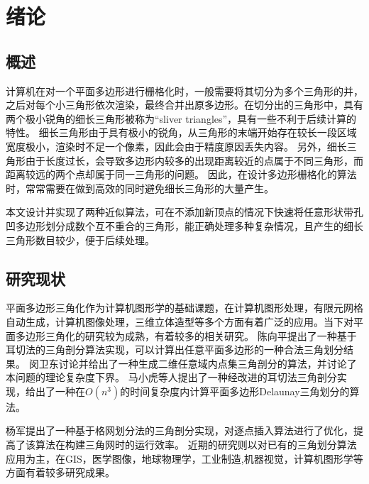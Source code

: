 
\chapter{绪论}

\section{概述}
  计算机在对一个平面多边形进行栅格化时，一般需要将其切分为多个三角形的并，之后对每个小三角形依次渲染，最终合并出原多边形。在切分出的三角形中，具有两个极小锐角的细长三角形被称为“sliver triangles”，具有一些不利于后续计算的特性。
  细长三角形由于具有极小的锐角，从三角形的末端开始存在较长一段区域宽度极小，渲染时不足一个像素，因此会由于精度原因丢失内容。
  另外，细长三角形由于长度过长，会导致多边形内较多的出现距离较近的点属于不同三角形，而距离较远的两个点却属于同一三角形的问题。
  因此，在设计多边形栅格化的算法时，常常需要在做到高效的同时避免细长三角形的大量产生。

  本文设计并实现了两种近似算法，可在不添加新顶点的情况下快速将任意形状带孔凹多边形划分成数个互不重合的三角形，能正确处理多种复杂情况，且产生的细长三角形数目较少，便于后续处理。
\section{研究现状}

平面多边形三角化作为计算机图形学的基础课题，在计算机图形处理，有限元网格自动生成，计算机图像处理，三维立体造型等多个方面有着广泛的应用。当下对平面多边形三角化的研究较为成熟，有着较多的相关研究。
陈向平提出了一种基于耳切法的三角剖分算法实现，可以计算出任意平面多边形的一种合法三角划分结果。
闵卫东讨论并给出了一种生成二维任意域内点集三角剖分的算法，并讨论了本问题的理论复杂度下界。
马小虎等人提出了一种经改进的耳切法三角剖分实现，给出了一种在\(O(n^3)\)的时间复杂度内计算平面多边形Delaunay三角划分的算法。

杨军提出了一种基于格网划分法的三角剖分实现，对逐点插入算法进行了优化，提高了该算法在构建三角网时的运行效率。
近期的研究则以对已有的三角划分算法应用为主，在GIS，医学图像，地球物理学，工业制造,机器视觉，计算机图形学等方面有着较多研究成果。


